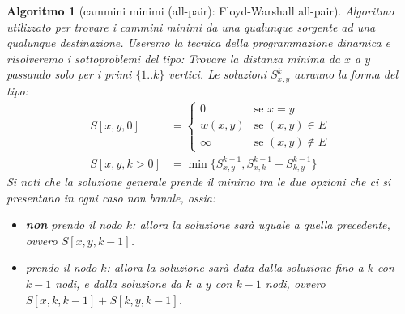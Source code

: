 \documentclass[oneside]{book}
\newtheorem{alg}{Algoritmo}
\begin{document}
\begin{alg}[cammini minimi (all-pair): Floyd-Warshall all-pair]
  Algoritmo utilizzato per trovare i cammini minimi da una qualunque sorgente ad
  una qualunque destinazione. Useremo la tecnica della programmazione dinamica e
  risolveremo i sottoproblemi del tipo: Trovare la distanza minima da $x$ a $y$
  passando solo per i primi $\{1..k\}$ vertici. Le soluzioni $S_{x,y}^k$ avranno
  la forma del tipo:
  \begin{align*}
    S[x,y,0] &= \begin{cases}
      0 & \text{se } x = y \\
      w(x,y) & \text{se } (x,y) \in E \\
      \infty & \text{se } (x,y) \not\in E
    \end{cases} \\
      S[x,y,k>0] &= \min\{S_{x,y}^{k-1}, S_{x,k}^{k-1} + S_{k,y}^{k-1}\}
  \end{align*}
  Si noti che la soluzione generale prende il minimo tra le due opzioni che ci si
  presentano in ogni caso non banale, ossia:
  \begin{itemize}
    \item \textbf{non} prendo il nodo $k$: allora la soluzione sar\`a uguale a
      quella precedente, ovvero $S[x,y,k-1]$.
    \item prendo il nodo $k$: allora la soluzione sar\`a data dalla soluzione
      fino a $k$ con $k-1$ nodi, e dalla soluzione da $k$ a $y$ con $k-1$ nodi,
      ovvero $S[x,k,k-1] + S[k,y,k-1]$.
  \end{itemize}


\end{alg}
\end{document}
